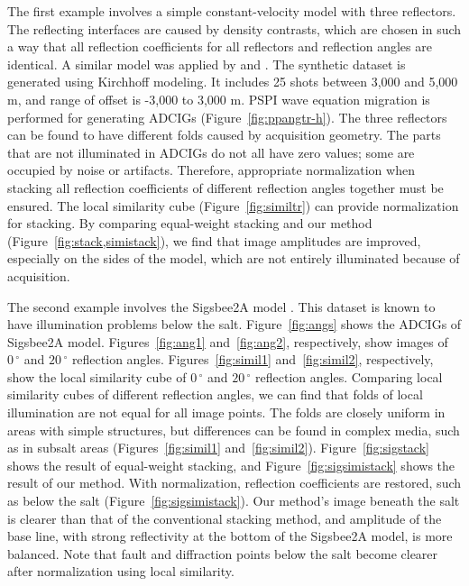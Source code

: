The first example involves a simple constant-velocity model with three reflectors. The reflecting interfaces are caused by density contrasts, which are chosen in such a way that all reflection coefficients for all reflectors and reflection angles are identical. A similar model was applied by \cite{Zhang2003} and \cite{Schleicher}. The synthetic dataset is generated using Kirchhoff modeling. It includes 25 shots between 3,000 and 5,000 m, and range of offset is -3,000 to 3,000 m. PSPI wave equation migration is performed for generating ADCIGs (Figure~\ref{fig:ppangtr-h}). The three reflectors can be found to have different folds caused by acquisition geometry. The parts that are not illuminated in ADCIGs do not all have zero values; some are occupied by noise or artifacts. Therefore, appropriate normalization when stacking all reflection coefficients of different reflection angles together must be ensured. The local similarity cube (Figure~\ref{fig:similtr}) can provide normalization for stacking. By comparing equal-weight stacking and our method (Figure~\ref{fig:stack,simistack}), we find that image amplitudes are improved, especially on the sides of the model, which are not entirely illuminated because of acquisition.


The second example involves the Sigsbee2A model \cite[]{Paffenholz}. This dataset is known to have illumination problems below the salt. Figure~\ref{fig:angs} shows the ADCIGs of Sigsbee2A model. Figures~\ref{fig:ang1} and~\ref{fig:ang2}, respectively, show images of $0\,^{\circ}$ and $20\,^{\circ}$  reflection angles. Figures~\ref{fig:simil1} and~\ref{fig:simil2}, respectively, show the local similarity cube of $0\,^{\circ}$ and $20\,^{\circ}$ reflection angles. Comparing local similarity cubes of different reflection angles, we can find that folds of local illumination are not equal for all image points. The folds are closely uniform in areas with simple structures, but differences can be found in complex media, such as in subsalt areas (Figures~\ref{fig:simil1} and~\ref{fig:simil2}). Figure~\ref{fig:sigstack} shows the result of equal-weight stacking, and Figure~\ref{fig:sigsimistack} shows the result of our method. With normalization, reflection coefficients are restored, such as below the salt (Figure~\ref{fig:sigsimistack}). Our method's image beneath the salt is clearer than that of the conventional stacking method, and amplitude of the base line, with strong reflectivity at the bottom of the Sigsbee2A model, is more balanced. Note that fault and diffraction points below the salt become clearer after normalization using local similarity.

